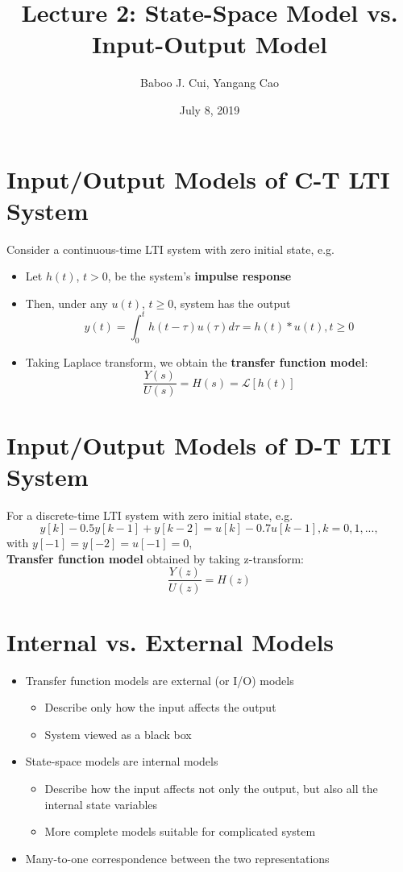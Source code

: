 \documentclass[10pt,a4paper,oneside]{article}
\date{July 8, 2019}
\author{Baboo J. Cui, Yangang Cao}
\title{Lecture 2: State-Space Model vs. Input-Output Model}
\begin{document}
\maketitle
\tableofcontents
\newpage
\section{Input/Output Models of C-T LTI System}
Consider a continuous-time LTI system with zero initial state, e.g.
\begin{itemize}
\item Let $h(t)$, $t>0$, be the system's {\bfseries impulse response}
\item Then, under any $u(t)$, $t\geq0$, system has the output
\[
y(t)=\int_{0}^{t}h(t-\tau)u(\tau)d\tau=h(t)*u(t), t\geq0
\]
\item Taking Laplace transform, we obtain the {\bfseries transfer function model}:
\[
\frac{Y(s)}{U(s)}=H(s)=\mathcal{L}[h(t)]
\]
\end{itemize}
\section{Input/Output Models of D-T LTI System}
For a discrete-time LTI system with zero initial state, e.g.
\[
y[k]-0.5y[k-1]+y[k-2]=u[k]-0.7u[k-1], k=0,1,...,
\]
with $y[-1]=y[-2]=u[-1]=0$,\\
{\bfseries Transfer function model} obtained by taking z-transform:
\[
\frac{Y(z)}{U(z)}=H(z)
\]
\section{Internal vs. External Models}
\begin{itemize}
\item Transfer function models are external (or I/O) models
\begin{itemize}
\item Describe only how the input affects the output
\item System viewed as a black box
\end{itemize}
\item State-space models are internal models
\begin{itemize}
\item Describe how the input affects not only the output, but also all the internal state variables
\item More complete models suitable for complicated system
\end{itemize}
\item Many-to-one correspondence between the two representations
\end{itemize}
\end{document}
